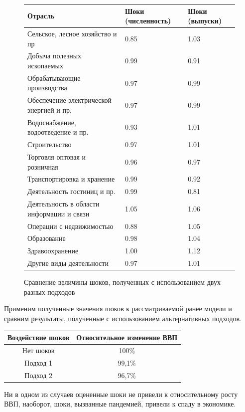 \documentclass[12pt, a4paper]{article}
\begin{document}
\begin{figure}
\begin{center}
\begin{tabular}{|l|l|l|}
\hline
 Отрасль & Шоки (численность) & Шоки (выпуски)\\
\hline
 Сельское, лесное хозяйство и пр &  0.85 & 1.03\\
 Добыча полезных ископаемых & 0.99 & 0.91\\
 Обрабатывающие производства & 0.97 & 0.99\\
 Обеспечение электрической энергией и пр. &  0.97 & 0.99\\
 Водоснабжение, водоотведение и пр. & 0.93 & 1.01\\
 Строительство &  0.97 & 1.01\\
 Торговля оптовая и розничная & 0.96 & 0.97\\
 Транспортировка и хранение & 0.99 & 0.92\\
 Деятельность гостиниц и пр. & 0.99 & 0.81\\
 Деятельность в области информации и связи & 1.05 & 1.06\\
 Операции с недвижимостью & 0.88 & 1.05\\
 Образование & 0.98 & 1.04\\
 Здравоохранение & 1.00 & 1.12\\
 Другие виды деятельности & 0.97 & 1.01\\
\hline
\end{tabular}
\label{shock_compare}
\caption{Сравнение величины шоков, полученных с использованием двух разных подходов}
\end{center}
\end{figure}

Применим полученные значения шоков к рассматриваемой ранее модели и сравним результаты, полученные с использованием альтернативных подходов.

\begin{center}
\begin{tabular}{|c|c|}
\hline
Воздействие шоков & Относительное изменение ВВП\\
\hline
Нет шоков & 100\%\\
Подход 1 & 99,1\%\\
Подход 2 & 96,7\%\\
\hline
\end{tabular}
\end{center}

Ни в одном из случаев оцененные шоки не привели к относительному росту ВВП, наоборот,  шоки, вызванные пандемией, привели к спаду в экономике. 
\end{document}
